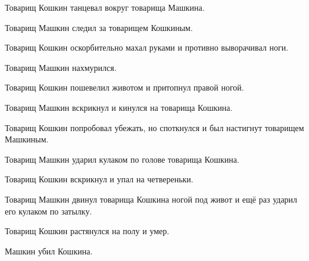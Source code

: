 Товарищ Кошкин танцевал вокруг товарища Машкина.

Товарищ Машкин следил за товарищем Кошкиным.

Товарищ Кошкин оскорбительно махал руками и противно выворачивал ноги.

Товарищ Машкин нахмурился.

Товарищ Кошкин пошевелил животом и притопнул правой ногой.

Товарищ Машкин вскрикнул и кинулся на товарища Кошкина.

Товарищ Кошкин попробовал убежать, но споткнулся и был настигнут товарищем Машкиным.

Товарищ Машкин ударил кулаком по голове товарища Кошкина.

Товарищ Кошкин вскрикнул и упал на четвереньки.

Товарищ Машкин двинул товарища Кошкина ногой под живот и ещё раз ударил его кулаком по затылку.

Товарищ Кошкин растянулся на полу и умер.

Машкин убил Кошкина.